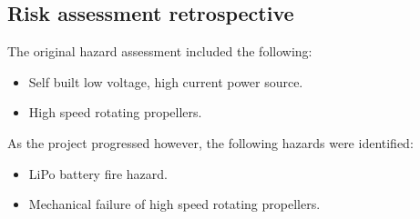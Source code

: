 \documentclass[12pt,a4paper]{article}
\begin{document}
\newpage

\subsection{Risk assessment retrospective}

The original hazard assessment included the following:
\begin{itemize}
    \item Self built low voltage, high current power source.
    \item High speed rotating propellers.
\end{itemize}
As the project progressed however, the following hazards were identified:
\begin{itemize}
    \item LiPo battery fire hazard.
    \item Mechanical failure of high speed rotating propellers.
\end{itemize}

\newpage
\printbibliography
\end{document}
